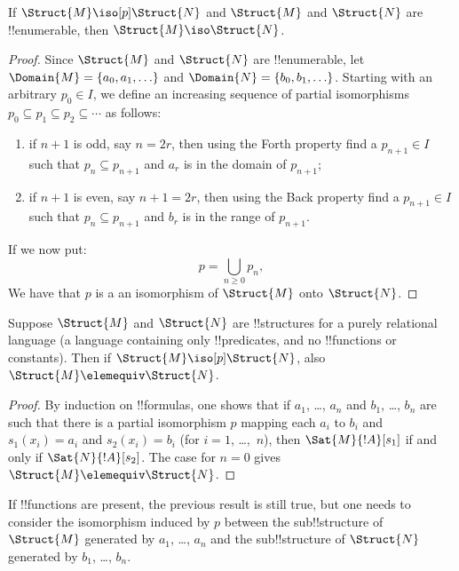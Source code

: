 \documentclass[../../include/open-logic-section]{subfiles}
\begin{document}
\begin{thm}
  If $\Struct{M} \iso[p] \Struct{N}$ and $\Struct{M}$ and
  $\Struct{N}$ are !!{enumerable}, then $\Struct{M} \iso
  \Struct{N}$.
\end{thm}

\begin{proof}
  Since $\Struct{M}$ and $\Struct{N}$ are !!{enumerable}, let $\Domain{M} =
  \{a_0, a_1, \ldots \}$ and $\Domain{N} = \{b_0, b_1, \ldots \}$. Starting
  with an arbitrary $p_0 \in I$, we define an increasing
  sequence of partial isomorphisms $p_0 \subseteq p_1 \subseteq p_2
  \subseteq \cdots$ as follows:
  \begin{enumerate}
  \item if $n+1$ is odd, say $n = 2r$, then using the Forth property
    find a $p_{n+1} \in I$ such that $p_n \subseteq p_{n+1}$
    and $a_r$ is in the domain of $p_{n+1}$;
  \item if $n+1$ is even, say $n+1 =2r$, then using the Back property
    find a $p_{n+1} \in I$ such that $p_n \subseteq p_{n+1}$
    and $b_r$ is in the range of $p_{n+1}$.
  \end{enumerate}
If we now put:
\[
p = \bigcup_{n\ge 0} p_n,
\]
We have that $p$ is a an isomorphism of $\Struct{M}$ onto
$\Struct{N}$.
\end{proof}

\begin{thm}
  Suppose $\Struct{M}$ and $\Struct{N}$ are !!{structure}s for a purely
  relational language (a language containing only !!{predicate}s,
  and no !!{function}s or constants). Then if $\Struct{M} \iso[p]
  \Struct{N}$, also $\Struct{M} \elemequiv \Struct{N}$.
\end{thm}

\begin{proof}
  By induction on !!{formula}s, one shows that if $a_1$, \dots, $a_n$ and
  $b_1$, \dots, $b_n$ are such that there is a partial isomorphism $p$
  mapping each $a_i$ to $b_i$ and $s_1(x_i) =a_i$ and $s_2(x_i) =b_i$
  (for $i =1$, \dots,~$n$), then $\Sat{M}{!A}[s_1]$ if
  and only if $\Sat{N}{!A}[s_2]$. The case for $n=0$
  gives $\Struct{M} \elemequiv \Struct{N}$.
\end{proof}

\begin{rem}
If !!{function}s are present, the previous result is still true, but
one needs to consider the isomorphism induced by $p$ between the
sub!!{structure} of $\Struct{M}$ generated by $a_1$, \dots, $a_n$ and the
sub!!{structure} of $\Struct{N}$ generated by $b_1$, \dots, $b_n$.
\end{rem}
\end{document}
